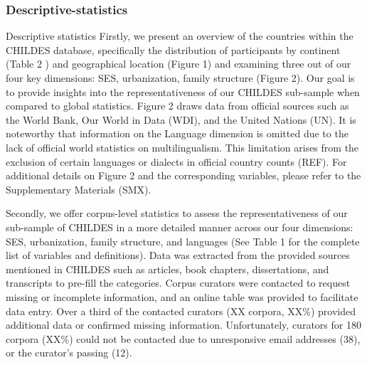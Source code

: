 \documentclass[
  man,floatsintext]{apa6}
\begin{document}
\subsubsection{Descriptive-statistics}\label{descriptive-statistics}

Descriptive statistics
Firstly, we present an overview of the countries within the CHILDES database, specifically the distribution of participants by continent (Table 2 ) and geographical location (Figure 1) and examining three out of our four key dimensions: SES, urbanization, family structure (Figure 2). Our goal is to provide insights into the representativeness of our CHILDES sub-sample when compared to global statistics. Figure 2 draws data from official sources such as the World Bank, Our World in Data (WDI), and the United Nations (UN). It is noteworthy that information on the Language dimension is omitted due to the lack of official world statistics on multilingualism. This limitation arises from the exclusion of certain languages or dialects in official country counts (REF). For additional details on Figure 2 and the corresponding variables, please refer to the Supplementary Materials (SMX).

Secondly, we offer corpus-level statistics to assess the representativeness of our sub-sample of CHILDES in a more detailed manner across our four dimensions: SES, urbanization, family structure, and languages (See Table 1 for the complete list of variables and definitions).
Data was extracted from the provided sources mentioned in CHILDES such as articles, book chapters, dissertations, and transcripts to pre-fill the categories. Corpus curators were contacted to request missing or incomplete information, and an online table was provided to facilitate data entry. Over a third of the contacted curators (XX corpora, XX\%) provided additional data or confirmed missing information. Unfortunately, curators for 180 corpora (XX\%) could not be contacted due to unresponsive email addresses (38), or the curator's passing (12).
\end{document}
